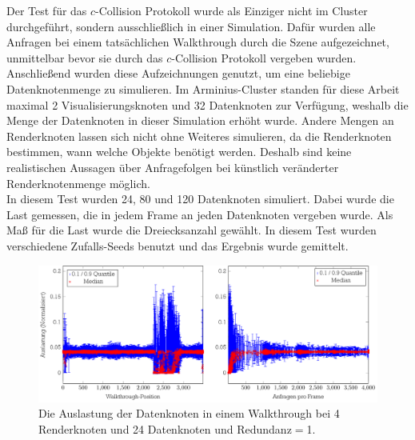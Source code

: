 Der Test für das $c$-Collision Protokoll wurde als Einziger nicht im Cluster durchgeführt, sondern ausschließlich in einer Simulation. Dafür wurden alle Anfragen bei einem tatsächlichen Walkthrough durch die Szene aufgezeichnet, unmittelbar bevor sie durch das $c$-Collision Protokoll vergeben wurden. Anschließend wurden diese Aufzeichnungen genutzt, um eine beliebige Datenknotenmenge zu simulieren. Im Arminius-Cluster standen für diese Arbeit maximal 2 Visualisierungsknoten und 32 Datenknoten zur Verfügung, weshalb die Menge der Datenknoten in dieser Simulation erhöht wurde. Andere Mengen an Renderknoten lassen sich nicht ohne Weiteres simulieren, da die Renderknoten bestimmen, wann welche Objekte benötigt werden. Deshalb sind keine realistischen Aussagen über Anfragefolgen bei künstlich veränderter Renderknotenmenge möglich.\\
In diesem Test wurden 24, 80 und 120 Datenknoten simuliert. Dabei wurde die Last gemessen, die in jedem Frame an jeden Datenknoten vergeben wurde. Als Maß für die Last wurde die Dreiecksanzahl gewählt. In diesem Test wurden verschiedene Zufalls-Seeds benutzt und das Ergebnis wurde gemittelt.
\begin{figure}
\centering
\includegraphics[scale=0.75]{images/diag_cCol_red1_render4_data24_2x.pdf}
  \caption{\label{fig:eval:cCol1}Die Auslastung der Datenknoten in einem Walkthrough bei 4 Renderknoten und 24 Datenknoten und Redundanz$=$1.}
\end{figure}

